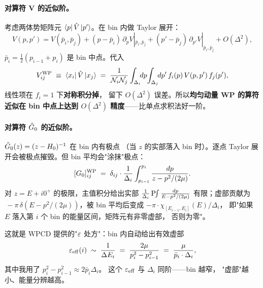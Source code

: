 \paragraph{对算符 V 的近似阶。}
考虑两体势矩阵元 \(\bra{p}\hat{V}\ket{p'}\)。在 bin 内做 Taylor 展开：
\begin{equation}
V(p, p') = V(\bar{p}_i, \bar{p}_j)
        + (p - \bar{p}_i)\,\partial_p V|_{\bar{p}_i, \bar{p}_j}
        + (p' - \bar{p}_j)\,\partial_{p'} V|_{\bar{p}_i, \bar{p}_j}
        + O(\Delta^2),
\end{equation}
\(\bar{p}_i = \tfrac{1}{2}(p_{i-1} + p_i)\) 是 bin 中点。代入
\begin{equation}
\label{eq:ch05-V-WP-elt}
V_{ij}^{\rm WP}
\;\equiv\;
\bra{x_i}\hat{V}\ket{x_{j}}
\;=\;
\frac{1}{\mathcal{N}_i \mathcal{N}_j}
\int_{\Delta_i}\!\!dp\!\int_{\Delta_j}\!\!dp'\,
   f_i(p)\,V(p, p')\,f_j(p'),
\end{equation}
线性项在 \(f_i = 1\) 下\textbf{对称积分掉}，
留下 \(O(\Delta^2)\) 误差。所以\textbf{均匀动量 WP 的算符
近似在 bin 中点上达到 \(O(\Delta^2)\) 精度}——比单点求积法好一阶。

\paragraph{对算符 \(\hat{G}_0\) 的近似阶。}
\(\hat{G}_0(z) = (z - H_0)^{-1}\) 在 bin 内有极点
（当 \(z\) 的实部落入 bin 时）。逐点 Taylor 展开会被极点摧毁。但 bin
平均会"涂抹"极点：
\begin{equation}
\label{eq:ch05-G0-WP-elt}
[G_0]_{ij}^{\rm WP}
\;=\;
\delta_{ij} \cdot \frac{1}{\Delta_i}
\int_{p_{i-1}}^{p_i} \frac{dp}{z - p^2/(2\mu)}.
\end{equation}
对 \(z = E + i 0^+\) 的极限，主值积分给出实部
\(\frac{1}{\Delta_i}\,\mathrm{P}\!\!\int \frac{dp}{E - p^2/(2\mu)}\)
有限；虚部贡献为
\(\,-\pi\,\delta(E - p^2/(2\mu))\)，被 bin 平均后变成
\(-\pi \cdot \chi_{[E_{i-1}, E_i]}(E) / \Delta_i\)，
即"如果 \(E\) 落入第 \(i\) 个 bin 的能量区间，矩阵元有非零虚部，
否则为零"。

这就是 WPCD 提供的"\(\varepsilon\) 处方"：bin 内自动给出有效虚部
\begin{equation}
\label{eq:ch05-eps-eff}
\varepsilon_{\rm eff}(i)
\;\sim\;
\frac{1}{\Delta E_i}
\;=\;
\frac{2\mu}{p_i^2 - p_{i-1}^2}
\;=\;
\frac{\mu}{\bar{p}_i \cdot \Delta_i},
\end{equation}
其中我用了 \(p_i^2 - p_{i-1}^2 \approx 2\bar{p}_i \Delta_i\)。
这个 \(\varepsilon_{\rm eff}\) 与 \(\Delta_i\) 同阶——bin 越窄，
"虚部"越小、能量分辨越高。

